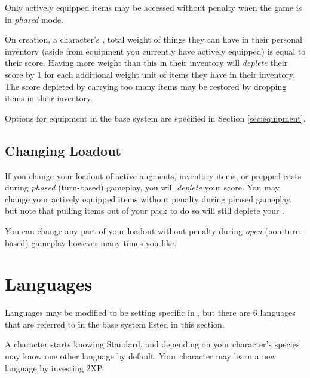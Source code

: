 Only actively equipped items may be accessed without penalty when the game is in \emph{phased} mode.

On creation, a character's , total weight of things they can have in their personal inventory (aside from equipment you currently have actively equipped) is equal to their  score. Having more weight than this in their inventory will \emph{deplete} their  score by 1 for each additional weight unit of items they have in their inventory. The  score depleted by carrying too many items may be restored by dropping items in their inventory.

Options for equipment in the base system are specified in Section \ref{sec:equipment}.

\subsection{Changing Loadout}

If you change your loadout of active augments, inventory items, or prepped casts during \emph{phased} (turn-based) gameplay, you will \emph{deplete} your  score. You may change your actively equipped items without penalty during phased gameplay, but note that pulling items out of your pack to do so will still deplete your .

You can change any part of your loadout without penalty during \emph{open} (non-turn-based) gameplay however many times you like.

\section{Languages}

Languages may be modified to be setting specific in \GammaRP{}, but there are 6 languages that are referred to in the base system listed in this section.

A character starts knowing Standard, and depending on your character's species may know one other language by default. Your character may learn a new language by investing 2XP.

